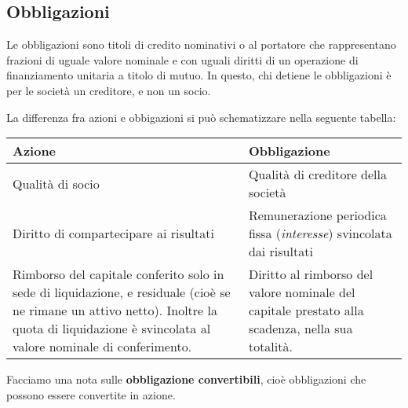 \documentclass[a4paper,11pt]{article}
\begin{document}
\subsection{Obbligazioni}
Le obbligazioni sono titoli di credito nominativi o al portatore che rappresentano frazioni di uguale valore nominale e con uguali diritti di un operazione di finanziamento unitaria a titolo di mutuo.
In questo, chi detiene le obbligazioni è per le società un creditore, e non un socio.

La differenza fra azioni e obbigazioni si può schematizzare nella seguente tabella:

\begin{table}[H]
	\center {}
	\begin{tabular} {p{7cm} | p{7cm}}
		\bfseries Azione & \bfseries Obbligazione \\
		\hline 
		Qualità di socio & Qualità di creditore della società \\
		Diritto di compartecipare ai risultati & Remunerazione periodica fissa (\textit{interesse}) svincolata dai risultati \\
		Rimborso del capitale conferito solo in sede di liquidazione, e residuale (cioè se ne rimane un attivo netto). Inoltre la quota di liquidazione è svincolata al valore nominale di conferimento. & Diritto al rimborso del valore nominale del capitale prestato alla scadenza, nella sua totalità. \\
	\end{tabular}
\end{table}

Facciamo una nota sulle \textbf{obbligazione convertibili}, cioè obbligazioni che possono essere convertite in azione.
\end{document}
